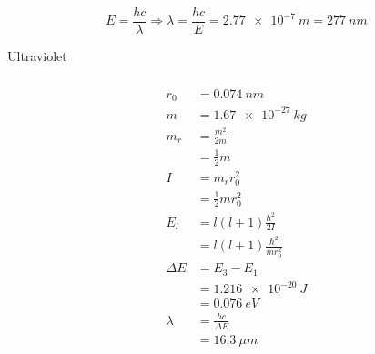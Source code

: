 \documentclass{article}
\begin{document}
\subsubsection{}

\[E = \frac{h c}{\lambda} \Rightarrow \lambda = \frac{h c}{E} = \qty{2.77e-7}{m} = \qty{277}{nm}\]

Ultraviolet

\setcounter{subsubsection}{2}
\subsubsection{}

\begin{align*}
  r_0      & = \qty{0.074}{nm}                   \\
  m        & = \qty{1.67e-27}{kg}                \\
  m_r      & = \frac{m^2}{2 m}                   \\
           & = \frac{1}{2} m                     \\
  I        & = m_r r_0^2                         \\
           & = \frac{1}{2} m r_0^2               \\
  E_l      & = l (l + 1) \frac{\hbar^2}{2 I}     \\
           & = l (l + 1) \frac{\hbar^2}{m r_0^2} \\
  \Delta E & = E_3 - E_1                         \\
           & = \qty{1.216e-20}{J}                \\
           & = \qty{0.076}{eV}                   \\
  \lambda  & = \frac{h c}{\Delta E}              \\
           & = \qty{16.3}{\mu m}
\end{align*}

\setcounter{subsubsection}{4}
\subsubsection{}
\end{document}
